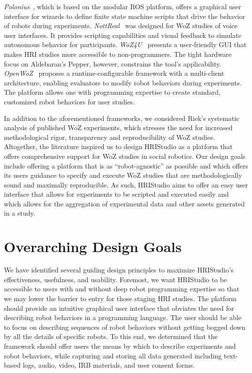 \documentclass[letterpaper, 10 pt, conference]{ieeeconf}
\begin{document}
\emph{Polonius}~\cite{Lu2011}, which is based on the modular ROS platform, offers a graphical user interface for wizards to define finite state machine scripts that drive the behavior of robots during experiments. \emph{NottReal}~\cite{Porcheron2020} was designed for WoZ studies of voice user interfaces. It provides scripting capabilities and visual feedback to simulate autonomous behavior for participants. \emph{WoZ4U}~\cite{Rietz2021} presents a user-friendly GUI that makes HRI studies more accessible to non-programmers. The tight hardware focus on Aldebaran's Pepper, however, constrains the tool's applicability. \emph{OpenWoZ}~\cite{Hoffman2016} proposes a runtime-configurable framework with a multi-client architecture, enabling evaluators to modify robot behaviors during experiments. The platform allows one with programming expertise to create standard, customized robot behaviors for user studies.

In addition to the aforementioned frameworks, we considered Riek's systematic analysis of published WoZ experiments, which stresses the need for increased methodological rigor, transparency and reproducibility of WoZ studies.~\cite{Riek2012} Altogether, the literature inspired us to design HRIStudio as a platform that offers comprehensive support for WoZ studies in social robotics. Our design goals include offering a platform that is as ``robot-agnostic'' as possible and which offers its users guidance to specify and execute WoZ studies that are methodologically sound and maximally reproducible. As such, HRIStudio aims to offer an easy user interface that allows for experiments to be scripted and executed easily and which allows for the aggregation of experimental data and other assets generated in a study.

\section{Overarching Design Goals}

We have identified several guiding design principles to maximize HRIStudio's effectiveness, usefulness, and usability. Foremost, we want HRIStudio to be accessible to users with and without deep robot programming expertise so that we may lower the barrier to entry for those staging HRI studies. The platform should provide an intuitive graphical user interface that obviates the need for describing robot behaviors in a programming language. The user should be able to focus on describing sequences of robot behaviors without getting bogged down by all the details of specific robots. To this end, we determined that the framework should offer users the means by which to describe experiments and robot behaviors, while capturing and storing all data generated including text-based logs, audio, video, IRB materials, and user consent forms. 
\end{document}
